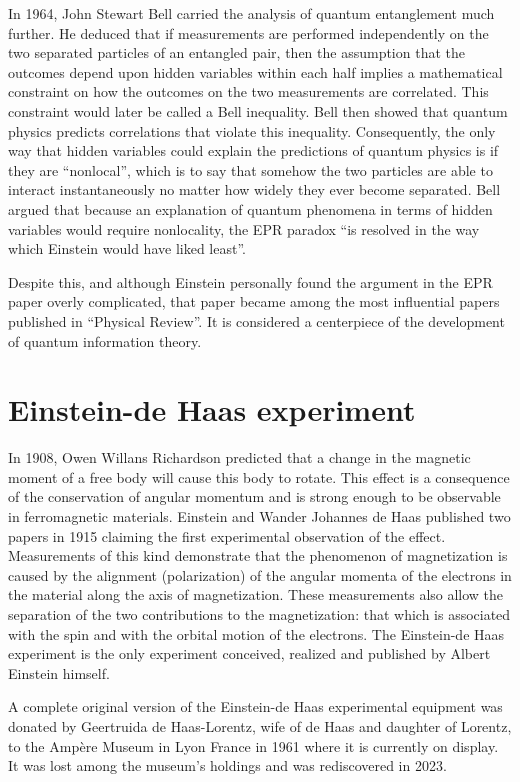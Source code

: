 \documentclass[twoside]{memoir}
\begin{document}
In 1964, John Stewart Bell carried the analysis of quantum entanglement much further. He deduced that if measurements are performed independently on the two separated particles of an entangled pair, then the assumption that the outcomes depend upon hidden variables within each half implies a mathematical constraint on how the outcomes on the two measurements are correlated. This constraint would later be called a Bell inequality. Bell then showed that quantum physics predicts correlations that violate this inequality. Consequently, the only way that hidden variables could explain the predictions of quantum physics is if they are \enquote{nonlocal}, which is to say that somehow the two particles are able to interact instantaneously no matter how widely they ever become separated. Bell argued that because an explanation of quantum phenomena in terms of hidden variables would require nonlocality, the \acrshort{EPR} paradox \enquote{is resolved in the way which Einstein would have liked least}.

Despite this, and although Einstein personally found the argument in the \acrshort{EPR} paper overly complicated, that paper became among the most influential papers published in \enquote{Physical Review}. It is considered a centerpiece of the development of quantum information theory.

\section{Einstein-de Haas experiment}\label{einstein-de-haas-experiment}

In 1908, Owen Willans Richardson predicted that a change in the magnetic moment of a free body will cause this body to rotate. This effect is a consequence of the conservation of angular momentum and is strong enough to be observable in ferromagnetic materials. Einstein and Wander Johannes de Haas published two papers in 1915 claiming the first experimental observation of the effect. Measurements of this kind demonstrate that the phenomenon of magnetization is caused by the alignment (polarization) of the angular momenta of the electrons in the material along the axis of magnetization. These measurements also allow the separation of the two contributions to the magnetization: that which is associated with the spin and with the orbital motion of the electrons. The Einstein-de Haas experiment is the only experiment conceived, realized and published by Albert Einstein himself.

A complete original version of the Einstein-de Haas experimental equipment was donated by Geertruida de Haas-Lorentz, wife of de Haas and daughter of Lorentz, to the Ampère Museum in Lyon France in 1961 where it is currently on display. It was lost among the museum's holdings and was rediscovered in 2023.\cite{San_Miguel_2024}
\end{document}
